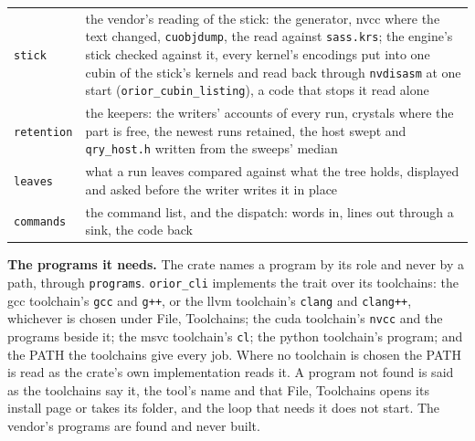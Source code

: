 {\begin{longtable}{>{\RaggedRight\arraybackslash}p{}>{\RaggedRight\arraybackslash}p{}}
\texttt{stick} & the vendor's reading of the stick: the generator, nvcc where the text changed, \texttt{cuobjdump}, the read against \texttt{sass.\allowbreak{}krs}; the engine's stick checked against it, every kernel's encodings put into one cubin of the stick's kernels and read back through \texttt{nvdisasm} at one start (\texttt{orior\_\allowbreak{}cubin\_\allowbreak{}listing}), a code that stops it read alone \\
\texttt{retention} & the keepers: the writers' accounts of every run, crystals where the part is free, the newest runs retained, the host swept and \texttt{qry\_\allowbreak{}host.\allowbreak{}h} written from the sweeps' median \\
\texttt{leaves} & what a run leaves compared against what the tree holds, displayed and asked before the writer writes it in place \\
\texttt{commands} & the command list, and the dispatch: words in, lines out through a sink, the code back \\
\bottomrule
\end{longtable}
}

\textbf{The programs it needs.} The crate names a program by its role and never by a path, through \texttt{programs}. \texttt{orior\_\allowbreak{}cli} implements the trait over its toolchains: the gcc toolchain's \texttt{gcc} and \texttt{g++}, or the llvm toolchain's \texttt{clang} and \texttt{clang++}, whichever is chosen under File, Toolchains; the cuda toolchain's \texttt{nvcc} and the programs beside it; the msvc toolchain's \texttt{cl}; the python toolchain's program; and the PATH the toolchains give every job. Where no toolchain is chosen the PATH is read as the crate's own implementation reads it. A program not found is said as the toolchains say it, the tool's name and that File, Toolchains opens its install page or takes its folder, and the loop that needs it does not start. The vendor's programs are found and never built.

